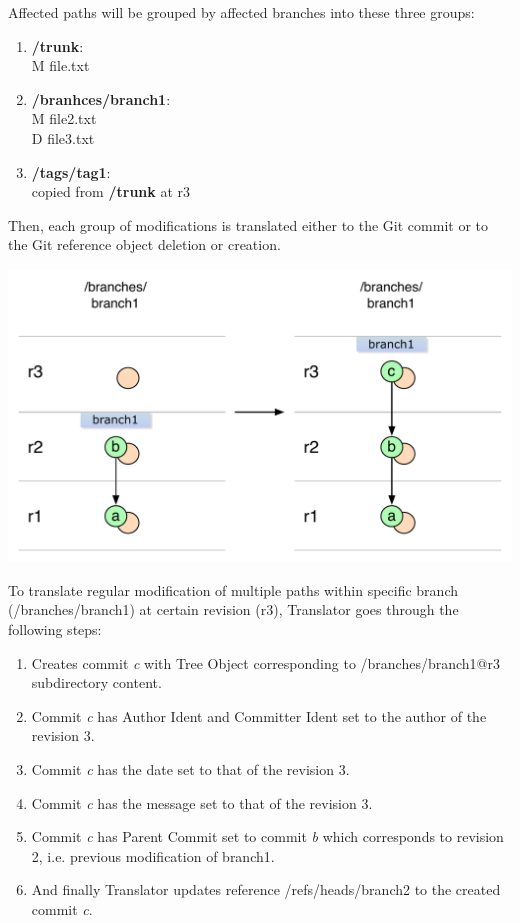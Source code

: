 Affected paths will be grouped by affected branches into these three groups:
\begin{enumerate}
\item \textbf{/trunk}:\\
M file.txt
\item \textbf{/branhces/branch1}:\\
M file2.txt\\
D file3.txt
\item \textbf{/tags/tag1}:\\
  copied from \textbf{/trunk} at r3
\end{enumerate}
Then, each group of modifications is translated either to the Git commit or to
the Git reference object deletion or creation.
\begin{center}
\includegraphics[width=\textwidth]{img/diagrams/single_change_svn_to_git.pdf}%
\label{single_change_svn_to_git}%
\end{center}
To translate regular modification of multiple paths within specific branch (/branches/branch1) at certain revision (r3), 
Translator goes through the following steps: 
\begin{enumerate}
	\compactlist
	\item Creates commit \emph{c} with Tree Object corresponding to /branches/branch1@r3 subdirectory content.
	\item Commit \emph{c} has Author Ident and Committer Ident set to the author of the revision 3.
	\item Commit \emph{c} has the date set to that of the revision 3.
	\item Commit \emph{c} has the message set to that of the revision 3.
	\item Commit \emph{c} has Parent Commit set to commit \emph{b} which corresponds to revision 2, i.e. previous modification of branch1.
	\item And finally Translator updates reference /refs/heads/branch2 to the created commit \emph{c}.
\end{enumerate}


